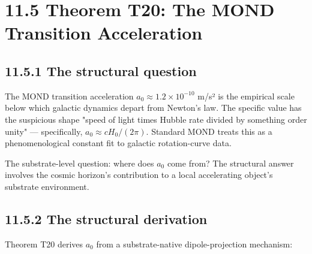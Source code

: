 \documentclass[11pt]{book}
\begin{document}
\section{11.5 Theorem T20: The MOND Transition Acceleration}

\subsection{11.5.1 The structural question}

The MOND transition acceleration $a_0 \approx 1.2 \times 10^{-10}$ m/s² is the empirical scale below which galactic dynamics depart from Newton's law. The specific value has the suspicious shape "speed of light times Hubble rate divided by something order unity" — specifically, $a_0 \approx c H_0 / (2\pi)$. Standard MOND treats this as a phenomenological constant fit to galactic rotation-curve data.

The substrate-level question: where does $a_0$ come from? The structural answer involves the cosmic horizon's contribution to a local accelerating object's substrate environment.

\subsection{11.5.2 The structural derivation}

Theorem T20 derives $a_0$ from a substrate-native dipole-projection mechanism:
\end{document}

